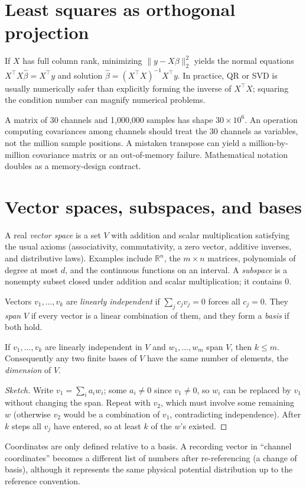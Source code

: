 \section{Least squares as orthogonal projection}
If $X$ has full column rank, minimizing $\|y-X\beta\|_2^2$ yields the normal equations $X^\top X\hat\beta=X^\top y$ and solution $\hat\beta=(X^\top X)^{-1}X^\top y$. In practice, QR or SVD is usually numerically safer than explicitly forming the inverse of $X^\top X$; squaring the condition number can magnify numerical problems.

\begin{workedexample}
A matrix of 30 channels and 1,000,000 samples has shape $30\times10^6$. An operation computing covariances among channels should treat the 30 channels as variables, not the million sample positions. A mistaken transpose can yield a million-by-million covariance matrix or an out-of-memory failure. Mathematical notation doubles as a memory-design contract.
\end{workedexample}
\section{Vector spaces, subspaces, and bases}
A real \emph{vector space} is a set $V$ with addition and scalar multiplication satisfying the usual axioms (associativity, commutativity, a zero vector, additive inverses, and distributive laws). Examples include $\mathbb R^n$, the $m\times n$ matrices, polynomials of degree at most $d$, and the continuous functions on an interval. A \emph{subspace} is a nonempty subset closed under addition and scalar multiplication; it contains $0$.

Vectors $v_1,\ldots,v_k$ are \emph{linearly independent} if $\sum_jc_jv_j=0$ forces all $c_j=0$. They \emph{span} $V$ if every vector is a linear combination of them, and they form a \emph{basis} if both hold.

\begin{theorem}
If $v_1,\ldots,v_k$ are linearly independent in $V$ and $w_1,\ldots,w_m$ span $V$, then $k\le m$. Consequently any two finite bases of $V$ have the same number of elements, the \emph{dimension} of $V$.
\end{theorem}
\begin{proof}[Sketch]
Write $v_1=\sum_ia_iw_i$; some $a_i\ne0$ since $v_1\ne0$, so $w_i$ can be replaced by $v_1$ without changing the span. Repeat with $v_2$, which must involve some remaining $w$ (otherwise $v_2$ would be a combination of $v_1$, contradicting independence). After $k$ steps all $v_j$ have entered, so at least $k$ of the $w$'s existed.
\end{proof}
Coordinates are only defined relative to a basis. A recording vector in ``channel coordinates'' becomes a different list of numbers after re-referencing (a change of basis), although it represents the same physical potential distribution up to the reference convention.

